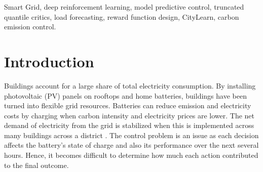 \documentclass[conference]{IEEEtran}
\begin{document}
\begin{abstract}
Residential batteries can contribute to the reduction of electricity costs and emissions by rescheduling energy
consumption. However, a controller of any battery system in a building is not equipped to be able to predict future
electricity demand, solar generation or carbon intensity. This work proposes a Reinforcement Learning (RL) based model
predictive controller for the batteries of an entire district. The load and solar outputs for every building are
predicted by gradient-boosted forecasters. Using these forecasts, a linear program plans the battery usage for the next
30 hours. An RL agent is trained using Truncated Quantile Critics (TQC) and a reward function based on the official
performance metric. Every hour the agent utilizes the district-level data to compute the three program weights. In the
CityLearn Challenge 2022 benchmark of 17 buildings, the controller reduced the electricity cost by 34.4 percent and
emissions by 22.1 percent in the training district. It achieved a mean public score of 0.774 and private score of 0.843
in Phase III, placing it at the 8th place among 42 public entries. Its carbon score of 0.764 was the lowest among all 42
entries. It is demonstrated through ablation studies that the optimiser, the forecasts and the RL tuning all contribute to the
overall performance.
\end{abstract}

\begin{IEEEkeywords}
Smart Grid, deep reinforcement learning, model predictive control, truncated quantile critics, load forecasting, reward
function design, CityLearn, carbon emission control.
\end{IEEEkeywords}

\section{Introduction}
Buildings account for a large share of total electricity consumption. By installing photovoltaic (PV) panels on rooftops
and home batteries, buildings have been turned into flexible grid resources. Batteries can reduce emission and
electricity costs by charging when carbon intensity and electricity prices are lower. The net demand of electricity from
the grid is stabilized when this is implemented across many buildings across a district
\cite{vazquez2019review,wang2020rlbuildings}. The control problem is an issue as each decision affects the battery's
state of charge and also its performance over the next several hours. Hence, it becomes difficult to determine how much
each action contributed to the final outcome.
\end{document}
